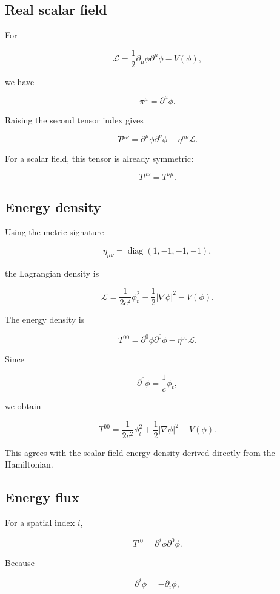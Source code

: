 \subsection{Real scalar field}

For

\[
\mathcal{L}
=
\frac{1}{2}
\partial_{\mu}\phi
\partial^{\mu}\phi
-
V(\phi),
\]

we have

\[
\pi^{\mu}
=
\partial^{\mu}\phi.
\]

Raising the second tensor index gives

\[
\boxed{
T^{\mu\nu}
=
\partial^{\mu}\phi
\partial^{\nu}\phi
-
\eta^{\mu\nu}\mathcal{L}
}.
\]

For a scalar field, this tensor is already symmetric:

\[
T^{\mu\nu}=T^{\nu\mu}.
\]

\subsection{Energy density}

Using the metric signature

\[
\eta_{\mu\nu}
=
\operatorname{diag}(1,-1,-1,-1),
\]

the Lagrangian density is

\[
\mathcal{L}
=
\frac{1}{2c^{2}}
\phi_t^{2}
-
\frac{1}{2}
|\nabla\phi|^{2}
-
V(\phi).
\]

The energy density is

\[
T^{00}
=
\partial^{0}\phi
\partial^{0}\phi
-
\eta^{00}\mathcal{L}.
\]

Since

\[
\partial^{0}\phi
=
\frac{1}{c}\phi_t,
\]

we obtain

\[
\boxed{
T^{00}
=
\frac{1}{2c^{2}}
\phi_t^{2}
+
\frac{1}{2}
|\nabla\phi|^{2}
+
V(\phi)
}.
\]

This agrees with the scalar-field energy density derived directly from the Hamiltonian.

\subsection{Energy flux}

For a spatial index \(i\),

\[
T^{i0}
=
\partial^{i}\phi
\partial^{0}\phi.
\]

Because

\[
\partial^{i}\phi
=
-\partial_i\phi,
\]

